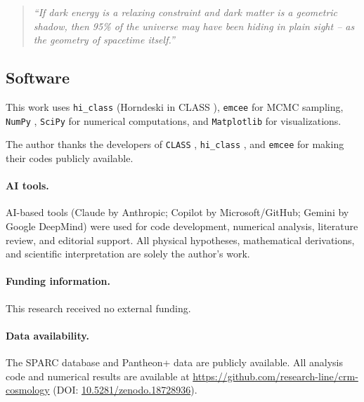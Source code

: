 \documentclass[aps,prd,twocolumn,superscriptaddress,nofootinbib]{revtex4-2}
\begin{document}
\begin{quote}
\textit{``If dark energy is a relaxing constraint and dark matter is a geometric shadow, then 95\% of the universe may have been hiding in plain sight -- as the geometry of spacetime itself.''}
\end{quote}


\subsection*{Software}

This work uses \texttt{hi\_class} \cite{Zumalacarregui2017} (Horndeski in CLASS \cite{Blas2011}), \texttt{emcee} \cite{ForemanMackey2013} for MCMC sampling, \texttt{NumPy} \cite{Harris2020}, \texttt{SciPy} \cite{Virtanen2020} for numerical computations, and \texttt{Matplotlib} \cite{Hunter2007} for visualizations.

\begin{acknowledgments}
The author thanks the developers of \texttt{CLASS} \cite{Blas2011},
\texttt{hi\_class} \cite{Zumalacarregui2017}, and
\texttt{emcee} \cite{ForemanMackey2013} for making their codes publicly
available.

\paragraph{AI tools.}
AI-based tools (Claude by Anthropic; Copilot by Microsoft/GitHub; Gemini by Google DeepMind) were used
for code development, numerical analysis, literature review, and editorial
support. All physical hypotheses, mathematical derivations, and scientific
interpretation are solely the author's work.
\end{acknowledgments}

\paragraph{Funding information.}
This research received no external funding.

\paragraph{Data availability.}
The SPARC database \cite{Lelli2016} and Pantheon+ data \cite{Scolnic2022}
are publicly available. All analysis code and numerical results are
available at \url{https://github.com/research-line/crm-cosmology}
(DOI: \href{https://doi.org/10.5281/zenodo.18728936}{10.5281/zenodo.18728936}).
\end{document}
